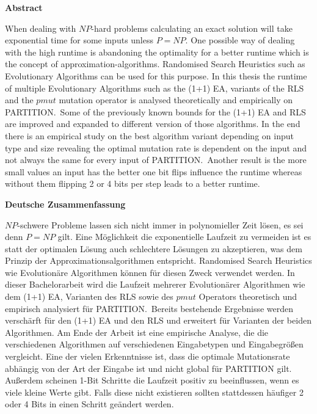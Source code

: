 \documentclass{thesisclass}
\begin{document}
\begin{addmargin}{0.5cm}

      \centerline{\textbf{Abstract}}

      When dealing with $NP$-hard problems calculating an exact solution will take exponential time for some inputs unless $P=NP$.
      One possible way of dealing with the high runtime is abandoning the optimality for a better runtime which is the concept of approximation-algorithms.
      Randomised Search Heuristics such as Evolutionary Algorithms can be used for this purpose.
      In this thesis the runtime of multiple Evolutionary Algorithms such as the (1+1) EA, variants of the RLS and the $pmut$ mutation operator is analysed theoretically and empirically on PARTITION.\ 
      Some of the previously known bounds for the (1+1) EA and RLS are improved and expanded to different version of those algorithms.
      In the end there is an empirical study on the best algorithm variant depending on input type and size revealing the optimal mutation rate is dependent on the input and not always the same for every input of PARTITION.\
      Another result is the more small values an input has the better one bit flips influence the runtime whereas without them flipping 2 or 4 bits per step leads to a better runtime.

      \centerline{\textbf{Deutsche Zusammenfassung}}

      $NP$-schwere Probleme lassen sich nicht immer in polynomieller Zeit lösen, es sei denn $P=NP$ gilt.
      Eine Möglichkeit die exponentielle Laufzeit zu vermeiden ist es statt der optimalen Lösung auch schlechtere Lösungen zu akzeptieren, was dem Prinzip der Approximationsalgorithmen entspricht.
      Randomised Search Heuristics wie Evolutionäre Algorithmen können für diesen Zweck verwendet werden.
      In dieser Bachelorarbeit wird die Laufzeit mehrerer Evolutionärer Algorithmen wie dem (1+1) EA, Varianten des RLS sowie des $pmut$ Operators theoretisch und empirisch analysiert für PARTITION.\ 
      Bereits bestehende Ergebnisse werden verschärft für den (1+1) EA und den RLS und erweitert für Varianten der beiden Algorithmen.
      Am Ende der Arbeit ist eine empirische Analyse, die die verschiedenen Algorithmen auf verschiedenen Eingabetypen und Eingabegrößen vergleicht.
      Eine der vielen Erkenntnisse ist, dass die optimale Mutationsrate abhängig von der Art der Eingabe ist und nicht global für PARTITION gilt.
      Außerdem scheinen 1-Bit Schritte die Laufzeit positiv zu beeinflussen, wenn es viele kleine Werte gibt.
      Falls diese nicht existieren sollten stattdessen häufiger 2 oder 4 Bits in einen Schritt geändert werden.


\end{addmargin}
\end{document}
